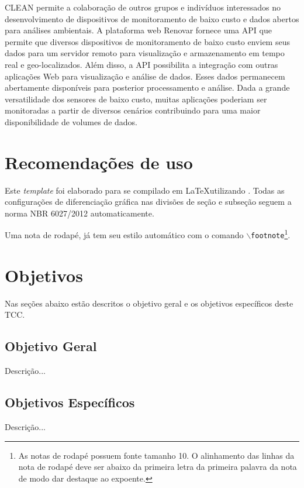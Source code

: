 CLEAN permite a colaboração de outros grupos e indivíduos interessados no desenvolvimento de dispositivos de monitoramento de baixo custo e dados abertos para análises ambientais. A plataforma web Renovar fornece uma API que permite que diversos dispositivos de monitoramento de baixo custo enviem seus dados para um servidor remoto para visualização e armazenamento em tempo real e geo-localizados. Além disso, a API possibilita a integração com outras aplicações Web para visualização e análise de dados. Esses dados permanecem abertamente disponíveis para posterior processamento e análise. Dada a grande versatilidade dos sensores de baixo custo, muitas aplicações poderiam ser monitoradas a partir de diversos cenários contribuindo para uma maior disponibilidade de volumes de dados.

\section{Recomendações de uso}

Este \emph{template} foi elaborado para se compilado em \LaTeX utilizando \abnTeX.  Todas as configurações de diferenciação gráfica nas divisões de seção e subseção seguem a  norma NBR 6027/2012 automaticamente. 

Uma nota de rodapé, já tem seu estilo automático com o comando \texttt{$\backslash$footnote}\footnote{As notas de rodapé possuem fonte tamanho 10. O alinhamento das linhas da nota de rodapé deve ser abaixo da primeira letra da primeira palavra da nota de modo dar destaque ao expoente.}.


\section{Objetivos}

Nas seções abaixo estão descritos o objetivo geral e os objetivos específicos deste TCC.

\subsection{Objetivo Geral}

Descrição...

\subsection{Objetivos Específicos}

Descrição...